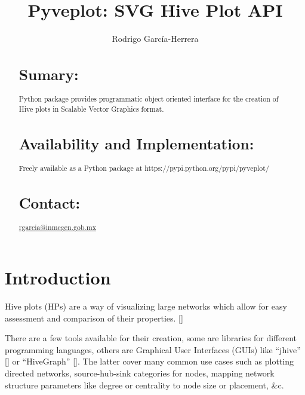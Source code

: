 \documentclass{bioinfo}
\begin{document}

\title[short Title]{Pyveplot: SVG Hive Plot API}
\author[]{Rodrigo Garc\'ia-Herrera}
\address{Department of Bioinformatics, National Institute of Genomic
  Medicine, Periferico Sur 4809, Mexico City 14610}



\maketitle

\begin{abstract}

\section{Sumary:}
Python package provides programmatic object oriented interface for the
creation of Hive plots in Scalable Vector Graphics format.
\section{Availability and Implementation:}
Freely available as a Python package at
https://pypi.python.org/pypi/pyveplot/

\section{Contact:} \href{rgarcia@inmegen.gob.mx}{rgarcia@inmegen.gob.mx}
\end{abstract}

\section{Introduction}

Hive plots (HPs) are a way of visualizing large networks which allow
for easy assessment and comparison of their properties.
[\cite{krzywinski2012hive}]

There are a few tools available for their creation, some are libraries
for different programming languages, others are Graphical User
Interfaces (GUIs) like ``jhive'' [\cite{jhive}] or ``HiveGraph''
[\cite{hivegraph}]. The latter cover many common use cases such as
plotting directed networks, source-hub-sink categories for nodes,
mapping network structure parameters like degree or centrality to node
size or placement, \&c.
\end{document}
